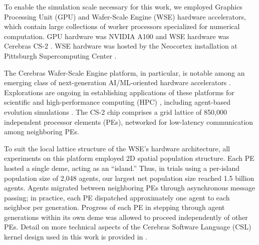 To enable the simulation scale necessary for this work, we employed Graphics Processing Unit (GPU) and Wafer-Scale Engine (WSE) hardware accelerators, which contain large collections of worker processors specialized for numerical computation.
GPU hardware was NVIDIA A100 and WSE hardware was Cerebras CS-2 \citep{choquette2021nvidia,cerebras2021wafer}.
WSE hardware was hosted by the Neocortex installation at Pittsburgh Supercomputing Center \citep{buitrago2021neocortex,Brashear2025}.

The Cerebras Wafer-Scale Engine platform, in particular, is notable among an emerging class of next-generation AI/ML-oriented hardware accelerators \citep{lauterbach2021path}.
Explorations are ongoing in establishing applications of these platforms for scientific and high-performance computing (HPC) \citep{rocki2020fast,brown2023exploring,ltaief2023scaling,sai2023massively,brown2022distributed,luow2020using,woo2022distributed,tramm2024efficient,chen2024using,phillips2023solving,chen2024solving}, including agent-based evolution simulations \citep{moreno2024trackable}.
The CS-2 chip comprises a grid lattice of 850,000 independent processor elements (PEs), networked for low-latency communication among neighboring PEs.

To suit the local lattice structure of the WSE's hardware architecture, all experiments on this platform employed 2D spatial population structure.
Each PE hosted a single deme, acting as an ``island.''
Thus, in trials using a per-island population size of 2,048 agents, our largest net population size reached 1.5 billion agents.
Agents migrated between neighboring PEs through asynchronous message passing;
in practice, each PE dispatched approximately one agent to each neighbor per generation.
Progress of each PE in stepping through agent generations within its own deme was allowed to proceed independently of other PEs.
Detail on more technical aspects of the Cerebras Software Language (CSL) kernel design used in this work is provided in \citet{moreno2024trackable}.


